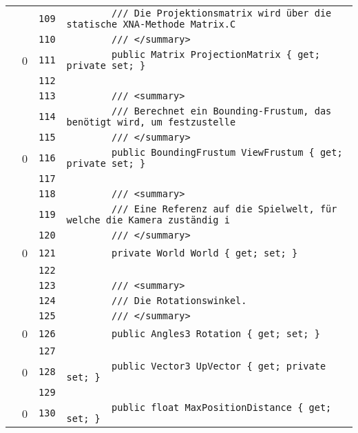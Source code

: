 \documentclass[a4paper,10pt]{article}
\begin{document}
\begin{longtable}[l]{lrrl}
\cellcolor{gray} &  & \verb~109~ & \verb~        /// Die Projektionsmatrix wird über die statische XNA-Methode Matrix.C~\\
\cellcolor{gray} &  & \verb~110~ & \verb~        /// </summary>~\\
\cellcolor{red} & 0 & \verb~111~ & \verb~        public Matrix ProjectionMatrix { get; private set; }~\\
\cellcolor{gray} &  & \verb~112~ & \verb~~\\
\cellcolor{gray} &  & \verb~113~ & \verb~        /// <summary>~\\
\cellcolor{gray} &  & \verb~114~ & \verb~        /// Berechnet ein Bounding-Frustum, das benötigt wird, um festzustelle~\\
\cellcolor{gray} &  & \verb~115~ & \verb~        /// </summary>~\\
\cellcolor{red} & 0 & \verb~116~ & \verb~        public BoundingFrustum ViewFrustum { get; private set; }~\\
\cellcolor{gray} &  & \verb~117~ & \verb~~\\
\cellcolor{gray} &  & \verb~118~ & \verb~        /// <summary>~\\
\cellcolor{gray} &  & \verb~119~ & \verb~        /// Eine Referenz auf die Spielwelt, für welche die Kamera zuständig i~\\
\cellcolor{gray} &  & \verb~120~ & \verb~        /// </summary>~\\
\cellcolor{red} & 0 & \verb~121~ & \verb~        private World World { get; set; }~\\
\cellcolor{gray} &  & \verb~122~ & \verb~~\\
\cellcolor{gray} &  & \verb~123~ & \verb~        /// <summary>~\\
\cellcolor{gray} &  & \verb~124~ & \verb~        /// Die Rotationswinkel.~\\
\cellcolor{gray} &  & \verb~125~ & \verb~        /// </summary>~\\
\cellcolor{red} & 0 & \verb~126~ & \verb~        public Angles3 Rotation { get; set; }~\\
\cellcolor{gray} &  & \verb~127~ & \verb~~\\
\cellcolor{red} & 0 & \verb~128~ & \verb~        public Vector3 UpVector { get; private set; }~\\
\cellcolor{gray} &  & \verb~129~ & \verb~~\\
\cellcolor{red} & 0 & \verb~130~ & \verb~        public float MaxPositionDistance { get; set; }~\\

\end{longtable}
\end{document}
